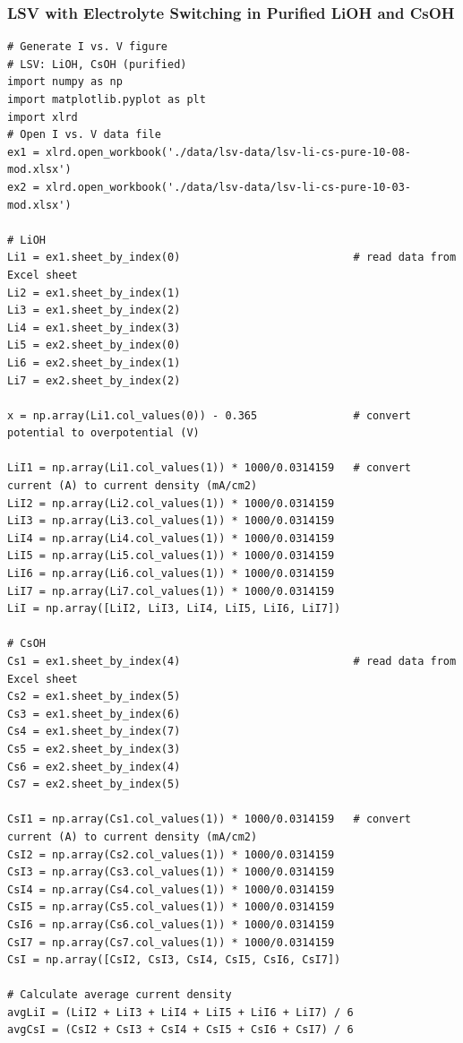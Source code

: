 \documentclass[journal=jpccck,manuscript=suppinfo,email=true]{achemso}
\begin{document}
\subsubsection{LSV with Electrolyte Switching in Purified LiOH and CsOH}
\label{sec-6-1-1}
\begin{verbatim}
# Generate I vs. V figure
# LSV: LiOH, CsOH (purified)
import numpy as np
import matplotlib.pyplot as plt
import xlrd
# Open I vs. V data file
ex1 = xlrd.open_workbook('./data/lsv-data/lsv-li-cs-pure-10-08-mod.xlsx')
ex2 = xlrd.open_workbook('./data/lsv-data/lsv-li-cs-pure-10-03-mod.xlsx')

# LiOH
Li1 = ex1.sheet_by_index(0)                           # read data from Excel sheet
Li2 = ex1.sheet_by_index(1)
Li3 = ex1.sheet_by_index(2)
Li4 = ex1.sheet_by_index(3)
Li5 = ex2.sheet_by_index(0)
Li6 = ex2.sheet_by_index(1)
Li7 = ex2.sheet_by_index(2)

x = np.array(Li1.col_values(0)) - 0.365               # convert potential to overpotential (V)

LiI1 = np.array(Li1.col_values(1)) * 1000/0.0314159   # convert current (A) to current density (mA/cm2)
LiI2 = np.array(Li2.col_values(1)) * 1000/0.0314159
LiI3 = np.array(Li3.col_values(1)) * 1000/0.0314159
LiI4 = np.array(Li4.col_values(1)) * 1000/0.0314159
LiI5 = np.array(Li5.col_values(1)) * 1000/0.0314159
LiI6 = np.array(Li6.col_values(1)) * 1000/0.0314159
LiI7 = np.array(Li7.col_values(1)) * 1000/0.0314159
LiI = np.array([LiI2, LiI3, LiI4, LiI5, LiI6, LiI7])

# CsOH
Cs1 = ex1.sheet_by_index(4)                           # read data from Excel sheet
Cs2 = ex1.sheet_by_index(5)
Cs3 = ex1.sheet_by_index(6)
Cs4 = ex1.sheet_by_index(7)
Cs5 = ex2.sheet_by_index(3)
Cs6 = ex2.sheet_by_index(4)
Cs7 = ex2.sheet_by_index(5)

CsI1 = np.array(Cs1.col_values(1)) * 1000/0.0314159   # convert current (A) to current density (mA/cm2)
CsI2 = np.array(Cs2.col_values(1)) * 1000/0.0314159
CsI3 = np.array(Cs3.col_values(1)) * 1000/0.0314159
CsI4 = np.array(Cs4.col_values(1)) * 1000/0.0314159
CsI5 = np.array(Cs5.col_values(1)) * 1000/0.0314159
CsI6 = np.array(Cs6.col_values(1)) * 1000/0.0314159
CsI7 = np.array(Cs7.col_values(1)) * 1000/0.0314159
CsI = np.array([CsI2, CsI3, CsI4, CsI5, CsI6, CsI7])

# Calculate average current density
avgLiI = (LiI2 + LiI3 + LiI4 + LiI5 + LiI6 + LiI7) / 6
avgCsI = (CsI2 + CsI3 + CsI4 + CsI5 + CsI6 + CsI7) / 6


\end{verbatim}
\end{document}
